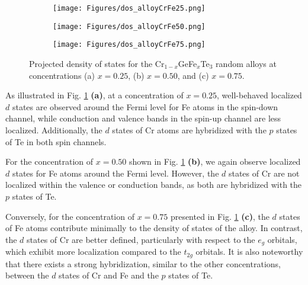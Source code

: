 \begin{figure}[H]
	\centering
	\begin{subfigure}{.50\textwidth}
		\centering
		\texttt{[image: Figures/dos\_alloyCrFe25.png]}
	\end{subfigure}%
	\hfill %
	\begin{subfigure}{.50\textwidth}
		\centering
		\texttt{[image: Figures/dos\_alloyCrFe50.png]}
	\end{subfigure}
	
	\begin{subfigure}{.50\textwidth}
		\centering
		\texttt{[image: Figures/dos\_alloyCrFe75.png]}
	\end{subfigure}%
	\caption{Projected density of states for the Cr$_{1-x}$GeFe$_{x}$Te$_{3}$ random alloys at concentrations (a) \( x = 0.25 \), (b) \( x = 0.50 \), and (c) \( x = 0.75 \).}
	\label{fig:dosplotCrFealloys}
\end{figure}

As illustrated in Fig. \ref{fig:dosplotCrFealloys} \textbf{(a)}, at a concentration of \( x = 0.25 \), well-behaved localized \( d \) states are observed around the Fermi level for Fe atoms in the spin-down channel, while conduction and valence bands in the spin-up channel are less localized. Additionally, the \( d \) states of Cr atoms are hybridized with the \( p \) states of Te in both spin channels.

For the concentration of \( x = 0.50 \) shown in Fig. \ref{fig:dosplotCrFealloys} \textbf{(b)}, we again observe localized \( d \) states for Fe atoms around the Fermi level. However, the \( d \) states of Cr are not localized within the valence or conduction bands, as both are hybridized with the \( p \) states of Te.

Conversely, for the concentration of \( x = 0.75 \) presented in Fig. \ref{fig:dosplotCrFealloys} \textbf{(c)}, the \( d \) states of Fe atoms contribute minimally to the density of states of the alloy. In contrast, the \( d \) states of Cr are better defined, particularly with respect to the \( e_g \) orbitals, which exhibit more localization compared to the \( t_{2g} \) orbitals. It is also noteworthy that there exists a strong hybridization, similar to the other concentrations, between the \( d \) states of Cr and Fe and the \( p \) states of Te.


